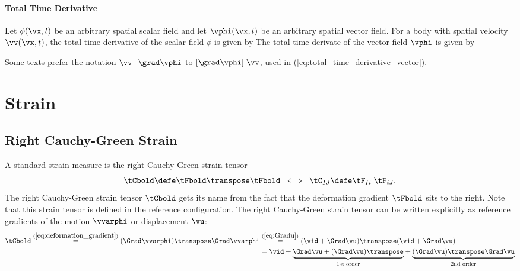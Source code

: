 \subsubsection{Total Time Derivative}
Let $\phi(\vx,t)$ be an arbitrary spatial scalar field and
let $\vphi(\vx,t)$ be an arbitrary spatial vector field.
For a body with spatial velocity $\vv(\vx, t)$, the total
time derivative of the scalar field $\phi$ is given by
\be
{}
 \label{eq:total_time_derivative_scalar}
\ee
The total time derivate of the vector field $\vphi$ is given by
\be
{}
\ee
\begin{Hremark}
Some texts prefer the notation $\vv \cdot \grad \vphi$ to
$[\grad \vphi] \; \vv$, used in 
(\ref{eq:total_time_derivative_vector}).
\end{Hremark}


\chapter{Strain}
\section{Right Cauchy-Green Strain}
A standard strain measure is the right Cauchy-Green
strain tensor
\begin{equation}
 \tCbold 
 \defe 
 \tFbold\transpose \tFbold
 \;\; \Longleftrightarrow \;\;
 \tC_{IJ} 
 \defe 
 \tF_{Ii} \; \tF_{iJ}. 
\end{equation}
The right Cauchy-Green strain tensor $\tCbold$ gets its name from the 
fact that the deformation gradient $\tFbold$ sits to the right.  
Note that this strain tensor is defined in the reference configuration.
The right Cauchy-Green strain tensor can be written
explicitly as reference gradients of the motion 
$\vvarphi$ or displacement $\vu$:
\begin{align}
\tCbold \overset{(\ref{eq:deformation_gradient})}{=} 
(\Grad \vvarphi)\transpose \Grad \vvarphi 
    &\overset{(\ref{eq:Gradu})}{=} 
    (\vid + \Grad \vu)\transpose (\vid + \Grad \vu) \\
    &= 
    \vid 
    + 
    \underset{\mbox{\footnotesize 1st order}}{\underbrace{\Grad \vu 
                                 + (\Grad \vu)\transpose}}
    + 
    \underset{\mbox{\footnotesize 
    2nd order}}{\underbrace{(\Grad \vu)\transpose\Grad \vu}}
    \label{eq:C_in_terms_of_u}
\end{align}

